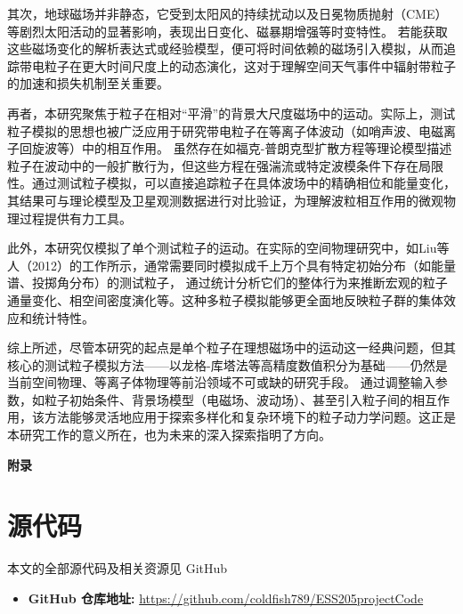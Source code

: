 \documentclass[11pt]{article}
\begin{document}
其次，地球磁场并非静态，它受到太阳风的持续扰动以及日冕物质抛射（CME）等剧烈太阳活动的显著影响，表现出日变化、磁暴期增强等时变特性。 若能获取这些磁场变化的解析表达式或经验模型，便可将时间依赖的磁场引入模拟，从而追踪带电粒子在更大时间尺度上的动态演化，这对于理解空间天气事件中辐射带粒子的加速和损失机制至关重要。


再者，本研究聚焦于粒子在相对“平滑”的背景大尺度磁场中的运动。实际上，测试粒子模拟的思想也被广泛应用于研究带电粒子在等离子体波动（如哨声波、电磁离子回旋波等）中的相互作用。 虽然存在如福克-普朗克型扩散方程等理论模型描述粒子在波动中的一般扩散行为，但这些方程在强湍流或特定波模条件下存在局限性。通过测试粒子模拟，可以直接追踪粒子在具体波场中的精确相位和能量变化，其结果可与理论模型及卫星观测数据进行对比验证，为理解波粒相互作用的微观物理过程提供有力工具。
\clearpage

此外，本研究仅模拟了单个测试粒子的运动。在实际的空间物理研究中，如Liu等人（2012）的工作所示，通常需要同时模拟成千上万个具有特定初始分布（如能量谱、投掷角分布）的测试粒子， 通过统计分析它们的整体行为来推断宏观的粒子通量变化、相空间密度演化等。这种多粒子模拟能够更全面地反映粒子群的集体效应和统计特性。


综上所述，尽管本研究的起点是单个粒子在理想磁场中的运动这一经典问题，但其核心的测试粒子模拟方法——以龙格-库塔法等高精度数值积分为基础——仍然是当前空间物理、等离子体物理等前沿领域不可或缺的研究手段。 通过调整输入参数，如粒子初始条件、背景场模型（电磁场、波动场）、甚至引入粒子间的相互作用，该方法能够灵活地应用于探索多样化和复杂环境下的粒子动力学问题。这正是本研究工作的意义所在，也为未来的深入探索指明了方向。

\nocite{*}
\clearpage
\printbibliography

\clearpage
\begin{center}
    \huge\textbf{附录}
\end{center}
\vspace{1em} 

\appendix
\section{源代码}

本文的全部源代码及相关资源见 GitHub 

\begin{itemize}
    \item \textbf{GitHub 仓库地址:} \href{https://github.com/coldfish789/ESS205projectCode}{https://github.com/coldfish789/ESS205projectCode}

\end{itemize}
\end{document}
